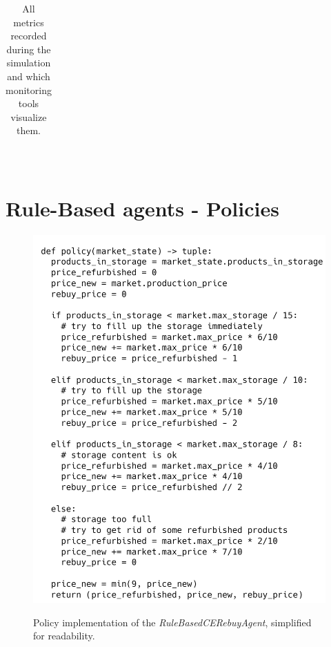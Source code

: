 \begin{table}[!]
\begin{tabular}{|cr|p{2.2mm}|p{2.2mm}|p{2.2mm}|p{2.2mm}|p{2.2mm}|p{2.2mm}|p{2.2mm}|p{2.2mm}|p{2.2mm}|p{2.2mm}|p{2.2mm}|p{2.2mm}|p{2.2mm}|p{2.2mm}|p{2.2mm}|p{2.2mm}|}
	\end{tabular}\\
	\caption{All metrics recorded during the simulation and which monitoring tools visualize them.}\label{tab:AllMetrics}
\end{table}

\newpage
\section*{Rule-Based agents - Policies}

\begin{figure}[ht]
	\includegraphics[width = \textwidth]{images/policies/RuleBasedCERebuyAgentPolicy.png}\\
	\caption{Policy implementation of the \emph{RuleBasedCERebuyAgent}, simplified for readability.}\label{fig:PolicyRuleBasedCERebuy}
\end{figure}

